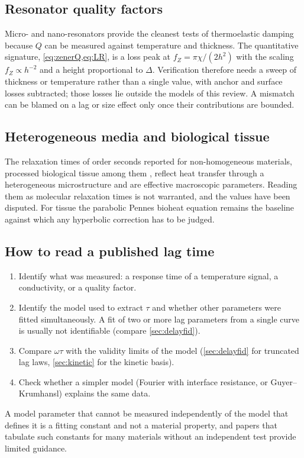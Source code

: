 \subsection{Resonator quality factors}
Micro- and nano-resonators provide the cleanest tests of thermoelastic damping because $Q$ can be measured against temperature and thickness. The quantitative signature, \cref{eq:zenerQ,eq:LR}, is a loss peak at $f_Z=\pi\chi/(2h^2)$ with the scaling $f_Z\propto h^{-2}$ and a height proportional to $\Delta$. Verification therefore needs a sweep of thickness or temperature rather than a single value, with anchor and surface losses subtracted; those losses lie outside the models of this review. A mismatch can be blamed on a lag or size effect only once their contributions are bounded.

\subsection{Heterogeneous media and biological tissue}
The relaxation times of order seconds reported for non-homogeneous materials, processed biological tissue among them \citep{Mitra1995,Kaminski1990}, reflect heat transfer through a heterogeneous microstructure and are effective macroscopic parameters. Reading them as molecular relaxation times is not warranted, and the values have been disputed. For tissue the parabolic Pennes bioheat equation \citep{Pennes1948} remains the baseline against which any hyperbolic correction has to be judged.


\subsection{How to read a published lag time}
\begin{enumerate}
\item Identify what was measured: a response time of a temperature signal, a conductivity, or a quality factor.
\item Identify the model used to extract $\tau$ and whether other parameters were fitted simultaneously. A fit of two or more lag parameters from a single curve is usually not identifiable (compare \cref{sec:delayfid}).
\item Compare $\omega\tau$ with the validity limits of the model (\cref{sec:delayfid} for truncated lag laws, \cref{sec:kinetic} for the kinetic basis).
\item Check whether a simpler model (Fourier with interface resistance, or Guyer--Krumhansl) explains the same data.
\end{enumerate}
A model parameter that cannot be measured independently of the model that defines it is a fitting constant and not a material property, and papers that tabulate such constants for many materials without an independent test provide limited guidance.

